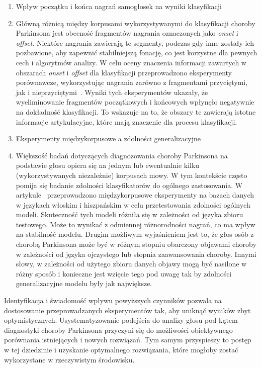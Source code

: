 \begin{enumerate}[label={\alph*)}]
	\item Wpływ początku i końca  nagrań samogłosek na wyniki klasyfikacji
\item[] Główną różnicą między korpusami wykorzystywanymi do klasyfikacji choroby Parkinsona jest obecność fragmentów nagrania oznaczonych jako \emph{onset} i \emph{offset}.
Niektóre nagrania zawierają te segmenty, podczas gdy inne zostały ich pozbawione, aby zapewnić stabilniejszą fonację, co jest korzystne dla pewnych cech i algorytmów analizy.
W celu oceny znaczenia informacji zawartych w obszarach \emph{onset} i \emph{offset} dla klasyfikacji przeprowadzono eksperymenty porównawcze,
wykorzystując nagrania zarówno z fragmentami przyciętymi, jak i nieprzyciętymi~\cite{SustainedVowelsProblems}.
Wyniki tych eksperymentów ukazały, że wyeliminowanie fragmentów początkowych i końcowych wpłynęło negatywnie na dokładność klasyfikacji.
To wskazuje na to, że obszary te zawierają istotne informacje artykulacyjne, które mają znaczenie dla procesu klasyfikacji.

 	\item Eksperymenty międzykorpusowe a zdolności generalizacyjne
	\item [] Większość badań dotyczących diagnozowania choroby Parkinsona na podstawie głosu opiera się na jednym lub ewentualnie kilku (wykorzystywanych niezależnie)
korpusach mowy.
W tym kontekście często pomija się badanie zdolności klasyfikatorów do ogólnego zastosowania.
W artykule~\cite{SustainedVowelsProblems} przeprowadzono międzykorpusowe eksperymenty na bazach danych w językach włoskim i hiszpańskim w celu
przetestowania zdolności ogólnych modeli.
Skuteczność tych modeli różniła się w zależności od języka zbioru testowego.
Może to wynikać z odmiennej różnorodności nagrań, co ma wpływ na stabilność modelu.
Drugim możliwym wyjaśnieniem jest to, że głos osób z chorobą Parkinsona może być w różnym stopniu obarczony objawami choroby w zależności od języka ojczystego lub stopnia zaawansowania choroby.
Innymi słowy, w zależności od użytego zbioru danych objawy mogą być nasilone w różny sposób i konieczne jest wzięcie tego pod uwagę tak by zdolności generalizacyjne modelu były jak największe.
\end{enumerate}


Identyfikacja i świadomość wpływu powyższych czynników pozwala na dostosowanie przeprowadzanych eksperymentów tak, aby uniknąć wyników zbyt optymistycznych.
Usystematyzowanie podejścia do analizy głosu pod kątem diagnostyki choroby Parkinsona przyczyni się do możliwości obiektywnego porównania istniejących i nowych rozwiązań.
Tym samym przyspieszy to postęp w tej dziedzinie i uzyskanie optymalnego rozwiązania, które mogłoby zostać wykorzystane w rzeczywistym środowisku.


